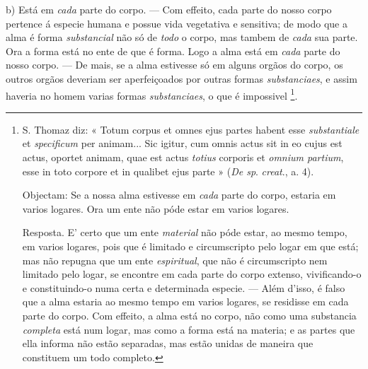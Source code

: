 b) Está em \emph{cada} parte do corpo. --- Com effeito, cada parte do nosso corpo pertence á especie humana e possue vida vegetativa e sensitiva; de modo que a alma é forma \emph{substancial} não só de \emph{todo} o corpo, mas tambem de \emph{cada} sua parte. Ora a forma está no ente de que é forma. Logo a alma está em \emph{cada} parte do nosso corpo. --- De mais, se a alma estivesse só em alguns orgãos do corpo, os outros orgãos deveriam ser   aperfeiçoados por outras formas \emph{substanciaes}, e assim haveria no homem varias formas \emph{substanciaes}, o que é impossivel \footnote{S. Thomaz diz: « Totum corpus et omnes ejus partes habent esse \emph{substantiale} et \emph{specificum} per animam... Sic igitur, cum omnis actus sit in eo cujus est actus, oportet animam, quae est actus \emph{totius} corporis et \emph{omnium partium}, esse in toto corpore et in qualibet ejus parte » (\emph{De sp}. \emph{creat}., a. 4).\par Objectam: Se a nossa alma estivesse em \emph{cada} parte do corpo, estaria em varios logares. Ora um ente não póde estar em varios logares.\par Resposta. E' certo que um ente \emph{material} não póde estar, ao mesmo tempo, em varios logares, pois que é limitado e circumscripto pelo logar em que está; mas não repugna que um ente \emph{espiritual}, que não é circumscripto nem limitado pelo logar, se encontre em cada parte do corpo extenso, vivificando-o e constituindo-o numa certa e determinada especie. --- Além d'isso, é falso que a alma estaria ao mesmo tempo em varios logares, se residisse em cada parte do corpo. Com effeito, a alma está no corpo, não como uma substancia \emph{completa} está num logar, mas como a forma está na materia; e as partes que ella informa não estão separadas, mas estão unidas de maneira que constituem um todo completo.}.


